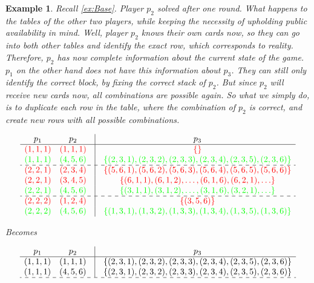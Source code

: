 \documentclass{article}
\newtheorem{example}{Example}[section]
\begin{document}
\begin{example}

Recall \cref{ex:Base}. Player $p_2$ solved after one round. What happens to the tables of the other two players, while keeping the necessity of upholding public availability in mind. Well, player $p_2$ knows their own cards now, so they can go into both other tables and identify the exact row, which corresponds to reality. Therefore, $p_2$ has now complete information about the current state of the game. $p_1$ on the other hand does not have this information about $p_3$. They can still only identify the correct block, by fixing the correct stack of $p_2$. But since $p_2$ will receive new cards now, all combinations are possible again. So what we simply do, is to duplicate each row in the table, where the combination of $p_2$ is correct, and create new rows with all possible combinations.

\[
\begin{array}{cccc}
p_1 & p_2 & \vline & p_3 \\ \hline
\color{red} (1,1,1) & \color{red} (1,1,1) & \vline & \color{red} \{ \} \\
\color{green} (1,1,1) & \color{green} (4,5,6) & \vline & \color{green} \{ (2,3,1), (2,3,2), (2,3,3), (2,3,4), (2,3,5), (2,3,6) \} \\  \hdashline

\color{red} (2,2,1) & \color{red} (2,3,4) & \vline & \color{red} \{ (5,6,1), (5,6,2), (5,6,3), (5,6,4), (5,6,5), (5,6,6) \} \\
\color{red} (2,2,1) & \color{red} (3,4,5) & \vline & \color{red} \{ (6,1,1), (6,1,2), \ldots, (6,1,6), (6,2,1), \ldots \} \\
\color{green} (2,2,1) & \color{green} (4,5,6) & \vline & \color{green} \{ (3,1,1), (3,1,2), \ldots, (3,1,6), (3,2,1), \ldots \} \color{black} \\  \hdashline

\color{red} (2,2,2) & \color{red} (1,2,4) & \vline & \color{red} \{ (3,5,6) \} \\
\color{green} (2,2,2) & \color{green} (4,5,6) & \vline & \color{green} \{ (1,3,1), (1,3,2), (1,3,3), (1,3,4), (1,3,5), (1,3,6) \} \color{black} \\  
\end{array} 
\]

Becomes

\[
\begin{array}{cccc}
p_1 & p_2 & \vline & p_3 \\ \hline
(1,1,1) & (1,1,1) & \vline & \{ (2,3,1), (2,3,2), (2,3,3), (2,3,4), (2,3,5), (2,3,6) \} \\
(1,1,1) & (4,5,6) & \vline & \{ (2,3,1), (2,3,2), (2,3,3), (2,3,4), (2,3,5), (2,3,6) \} \\  \hdashline


\end{array}\]
\end{example}
\end{document}
